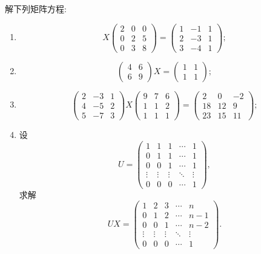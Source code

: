 \begin{example}
解下列矩阵方程:
\begin{enumerate}
  \item
  \[
  X
  \begin{pmatrix}
  2&0&0\\
  0&2&5\\
  0&3&8
  \end{pmatrix}
  =
  \begin{pmatrix}
  1&-1&1\\
  2&-3&1\\
  3&-4&1
  \end{pmatrix};
  \]
  \item
  \[
  \begin{pmatrix}4&6\\6&9\end{pmatrix}X
  =
  \begin{pmatrix}1&1\\1&1\end{pmatrix};
  \]
  \item
  \[
  \begin{pmatrix}
  2&-3&1\\
  4&-5&2\\
  5&-7&3
  \end{pmatrix}
  X
  \begin{pmatrix}
  9&7&6\\
  1&1&2\\
  1&1&1
  \end{pmatrix}
  =
  \begin{pmatrix}
  2&0&-2\\
  18&12&9\\
  23&15&11
  \end{pmatrix};
  \]
  \item 设
  \[
  U=
  \begin{pmatrix}
  1&1&1&\cdots&1\\
  0&1&1&\cdots&1\\
  0&0&1&\cdots&1\\
  \vdots&\vdots&\vdots&\ddots&\vdots\\
  0&0&0&\cdots&1
  \end{pmatrix},
  \]
  求解
  \[
  UX=
  \begin{pmatrix}
  1&2&3&\cdots&n\\
  0&1&2&\cdots&n-1\\
  0&0&1&\cdots&n-2\\
  \vdots&\vdots&\vdots&\ddots&\vdots\\
  0&0&0&\cdots&1
  \end{pmatrix}.
  \]
\end{enumerate}
\end{example}
\exampleblank

